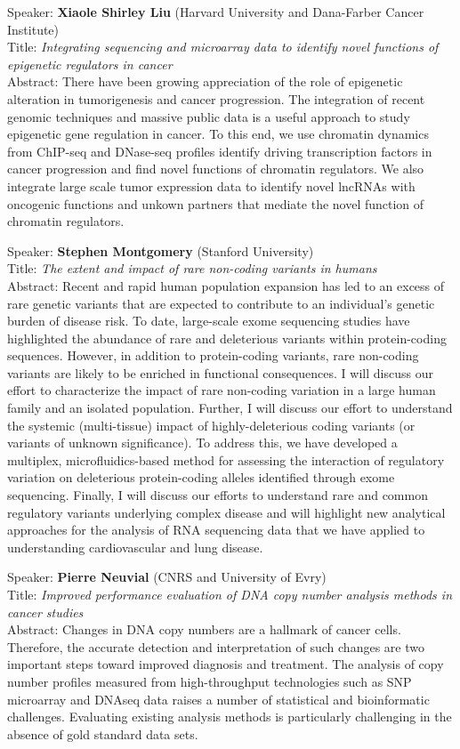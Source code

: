 \documentclass[11pt]{article}
\begin{document}
\bigskip
\noindent
Speaker: {\bf Xiaole Shirley Liu} (Harvard University and Dana-Farber Cancer Institute)\\
Title: {\it Integrating sequencing and microarray data to identify novel functions of epigenetic regulators in cancer}\\
Abstract: There have been growing appreciation of the role of
epigenetic alteration in tumorigenesis and cancer progression. The
integration of recent genomic techniques and massive public data is a
useful approach to study epigenetic gene regulation in cancer. To this
end, we use chromatin dynamics from ChIP-seq and DNase-seq profiles
identify driving transcription factors in cancer progression and find
novel functions of chromatin regulators. We also integrate large scale
tumor expression data to identify novel lncRNAs with oncogenic
functions and unkown partners that mediate the novel function of
chromatin regulators.

\bigskip
\noindent
Speaker: {\bf Stephen Montgomery} (Stanford University)\\
Title: {\it The extent and impact of rare non-coding variants in humans}\\
Abstract: Recent and rapid human population expansion has led to an
excess of rare genetic variants that are expected to contribute to an
individual's genetic burden of disease risk. To date, large-scale
exome sequencing studies have highlighted the abundance of rare and
deleterious variants within protein-coding sequences.  However, in
addition to protein-coding variants, rare non-coding variants are
likely to be enriched in functional consequences. I will discuss our
effort to characterize the impact of rare non-coding variation in a
large human family and an isolated population.  Further, I will
discuss our effort to understand the systemic (multi-tissue) impact of
highly-deleterious coding variants (or variants of unknown
significance). To address this, we have developed a multiplex,
microfluidics-based method for assessing the interaction of regulatory
variation on deleterious protein-coding alleles identified through
exome sequencing. Finally, I will discuss our efforts to understand
rare and common regulatory variants underlying complex disease and
will highlight new analytical approaches for the analysis of RNA
sequencing data that we have applied to understanding cardiovascular
and lung disease.

\bigskip
\noindent
Speaker: {\bf Pierre Neuvial} (CNRS and University of Evry)\\
Title: {\it Improved performance evaluation of DNA copy number analysis methods in cancer studies}\\
Abstract: Changes in DNA copy numbers are a hallmark of cancer cells.
Therefore, the accurate detection and interpretation of such changes
are two important steps toward improved diagnosis and treatment.  The
analysis of copy number profiles measured from high-throughput
technologies such as SNP microarray and DNAseq data raises a number of
statistical and bioinformatic challenges.  Evaluating existing
analysis methods is particularly challenging in the absence of gold
standard data sets.\\
\end{document}
